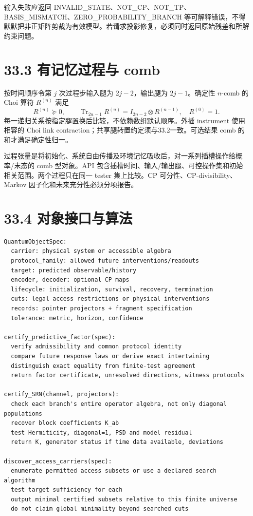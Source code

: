 \documentclass[
  11pt,
  oneside]{book}
\begin{document}
输入失败应返回
INVALID\_\allowbreak STATE、NOT\_\allowbreak CP、NOT\_\allowbreak TP、BASIS\_\allowbreak MISMATCH、ZERO\_\allowbreak PROBABILITY\_\allowbreak BRANCH
等可解释错误，不得默默把非正矩阵剪裁为有效模型。若请求投影修复，必须同时返回原始残差和所解约束问题。

\hypertarget{ux6709ux8bb0ux5fc6ux8fc7ux7a0bux4e0e-comb}{%
\section{33.3 有记忆过程与
comb}\label{ux6709ux8bb0ux5fc6ux8fc7ux7a0bux4e0e-comb}}

按时间顺序令第 \(j\) 次过程步输入腿为 \(2j-2\)，输出腿为
\(2j-1\)。确定性 \(n\)-comb 的 Choi 算符 \(R^{(n)}\) 满足 \[
R^{(n)}\succeq0,\qquad
\operatorname{Tr}_{2n-1}R^{(n)}
=I_{2n-2}\otimes R^{(n-1)},\quad R^{(0)}=1.
\] 每一递归关系按指定腿置换后比较，不依赖数组默认顺序。外插 instrument
使用相容的 Choi link contraction；共享腿转置约定须与33.2一致。可选结果
comb 的和才满足确定性归一。

过程张量是将初始化、系统自由传播及环境记忆吸收后，对一系列插槽操作给概率/末态的
comb 型对象。API
包含插槽时间、输入/输出腿、可控操作集和初始相关范围。两个过程只在同一
tester 集上比较。CP 可分性、CP-divisibility、Markov
因子化和未来充分性必须分项报告。

\hypertarget{ux5bf9ux8c61ux63a5ux53e3ux4e0eux7b97ux6cd5}{%
\section{33.4
对象接口与算法}\label{ux5bf9ux8c61ux63a5ux53e3ux4e0eux7b97ux6cd5}}

\begin{Verbatim}[breaklines,breakanywhere,fontsize=\scriptsize]
QuantumObjectSpec:
  carrier: physical system or accessible algebra
  protocol_family: allowed future interventions/readouts
  target: predicted observable/history
  encoder, decoder: optional CP maps
  lifecycle: initialization, survival, recovery, termination
  cuts: legal access restrictions or physical interventions
  records: pointer projectors + fragment specification
  tolerance: metric, horizon, confidence

certify_predictive_factor(spec):
  verify admissibility and common protocol identity
  compare future response laws or derive exact intertwining
  distinguish exact equality from finite-test agreement
  return factor certificate, unresolved directions, witness protocols

certify_SRN(channel, projectors):
  check each branch's entire operator algebra, not only diagonal populations
  recover block coefficients K_ab
  test Hermiticity, diagonal=1, PSD and model residual
  return K, generator status if time data available, deviations

discover_access_carriers(spec):
  enumerate permitted access subsets or use a declared search algorithm
  test target sufficiency for each
  output minimal certified subsets relative to this finite universe
  do not claim global minimality beyond searched cuts
\end{Verbatim}
\end{document}
